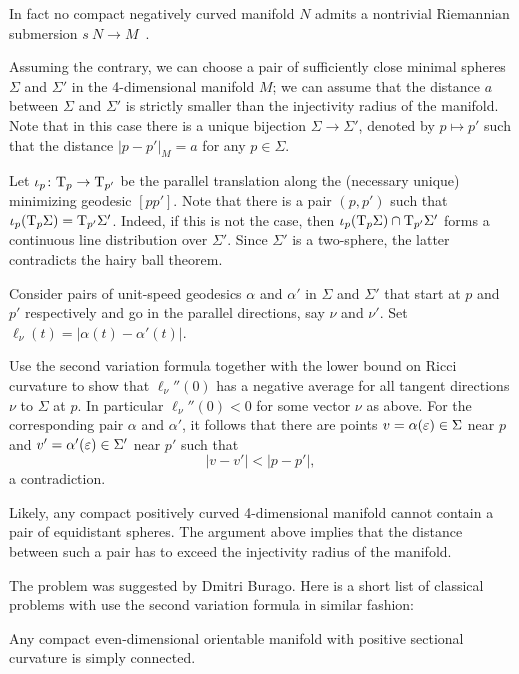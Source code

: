 In fact no compact negatively curved manifold $N$ admits a nontrivial Riemannian submersion $s\:N\to M$~\cite[see Theorem F in][]{zeghib}. 





Assuming the contrary,
we can choose a pair of sufficiently close minimal spheres $\Sigma$ and $\Sigma'$ in the 4-dimensional manifold $M$;
we can assume that the distance $a$ between $\Sigma$ and $\Sigma'$ is strictly smaller than the injectivity radius of the manifold.
Note that in this case there is a unique bijection $\Sigma\to \Sigma'$, denoted by $p\mapsto p'$ such that the distance $|p-p'|_M=a$ for any $p\in\Sigma$.

Let $\iota_p\colon\mathrm{T}_p\to\mathrm{T}_{p'}$ be the parallel translation along the (necessary unique) minimizing geodesic $[pp']$.
Note that there is a pair $(p,p')$ such that $\iota_p(\mathrm{T}_p\Sigma)=\mathrm{T}_{p'}\Sigma'$.
Indeed, if this is not the case, then $\iota_p(\T_p\Sigma)\z\cap\T_{p'}\Sigma'$ forms a continuous line distribution over $\Sigma'$.
Since $\Sigma'$ is a two-sphere, the latter contradicts the hairy ball theorem.

Consider pairs of unit-speed geodesics $\alpha$ and $\alpha'$ 
in $\Sigma$ and $\Sigma'$  
that start at $p$ and $p'$ respectively
and go in the parallel directions, say $\nu$ and $\nu'$. %
Set $\ell_\nu(t)=|\alpha(t)-\alpha'(t)|$.

Use the second variation formula together with the lower bound on Ricci curvature
to show that $\ell_\nu''(0)$ has a negative average for all tangent directions $\nu$ to $\Sigma$ at $p$. 
In particular $\ell_\nu''(0)<0$ for some vector $\nu$ as above.
For the corresponding pair $\alpha$ and $\alpha'$,
it follows that there are points $v=\alpha(\varepsilon)\in\Sigma$ near $p$ 
and $v'=\alpha'(\varepsilon)\in\Sigma'$ near $p'$
such that 
\[|v-v'|<|p-p'|,\]
a contradiction.\qeds

Likely, any compact positively curved 
4-dimensional manifold
cannot contain a pair of equidistant spheres.
The argument above implies that the distance between such a pair has to exceed the injectivity radius of the manifold.


The problem was suggested by Dmitri Burago.
Here is a short list of classical problems with use the second variation formula in similar 	fashion:

\begin{pr}
Any compact even-dimensional orientable manifold with positive sectional curvature is
simply connected.
\end{pr}

